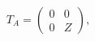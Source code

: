 \begin{equation}
T_{A}=\left(
\begin{array}{cc}
0 & 0 \\
0 & Z
\end{array}
\right) ,
\end{equation}


